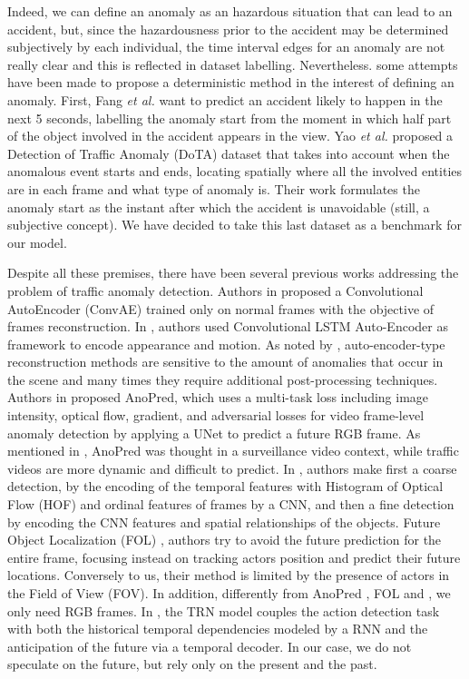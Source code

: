 Indeed, we can define an anomaly as an hazardous situation that can lead to an accident, but, since the hazardousness prior to the accident may be determined subjectively by each individual, the time interval edges for an anomaly are not really clear and this is reflected in dataset labelling.
Nevertheless. some attempts have been made to propose a deterministic method in the interest of defining an anomaly.
First, Fang \emph{et al.} \cite{fang2019dada} want to predict an accident likely to happen in the next 5 seconds, labelling the anomaly start from the moment in which half part of the object involved in the accident appears in the view.
Yao \emph{et al.} \cite{yao2020when} proposed a Detection of Traffic Anomaly (DoTA) dataset that takes into account when the anomalous event starts and ends, locating spatially where all the involved entities are in each frame and what type of anomaly is.
Their work formulates the anomaly start as the instant after which the accident is unavoidable (still, a subjective concept).
We have decided to take this last dataset as a benchmark for our model.

Despite all these premises, there have been several previous works addressing the problem of traffic anomaly detection.
Authors in \cite{hasan2016learning} proposed a Convolutional AutoEncoder (ConvAE) trained only on normal frames with the objective of frames reconstruction.
In \cite{luo2017remembering, wang2018abnormal}, authors used Convolutional LSTM Auto-Encoder as framework to encode appearance and motion.
As noted by \cite{ramachandra2020survey}, auto-encoder-type reconstruction methods are sensitive to the amount of anomalies that occur in the scene and many times they require additional post-processing techniques.
Authors in \cite{liu2018future} proposed AnoPred, which uses a multi-task loss including image intensity, optical flow, gradient, and adversarial losses for video frame-level anomaly detection by applying a UNet to predict a future RGB frame.
As mentioned in \cite{9712446}, AnoPred was thought in a surveillance video context, while traffic videos are more dynamic and difficult to predict.
In \cite{zhou_spatio-temporal_2022}, authors make first a coarse detection, by the encoding of the temporal features with Histogram of Optical Flow (HOF) \cite{wang2013action} and ordinal features of frames by a CNN, and then a fine detection by encoding the CNN features and spatial relationships of the objects.
Future Object Localization (FOL) \cite{9712446}, authors try to avoid the future prediction for the entire frame, focusing instead on tracking actors position and predict their future locations.
Conversely to us, their method is limited by the presence of actors in the Field of View (FOV).
In addition, differently from AnoPred \cite{liu2018future}, FOL \cite{9712446} and \cite{zhou_spatio-temporal_2022}, we only need RGB frames.
In \cite{xu2019temporal}, the TRN model couples the action detection task with both the historical temporal dependencies modeled by a RNN and the anticipation of the future via a temporal decoder.
In our case, we do not speculate on the future, but rely only on the present and the past.


